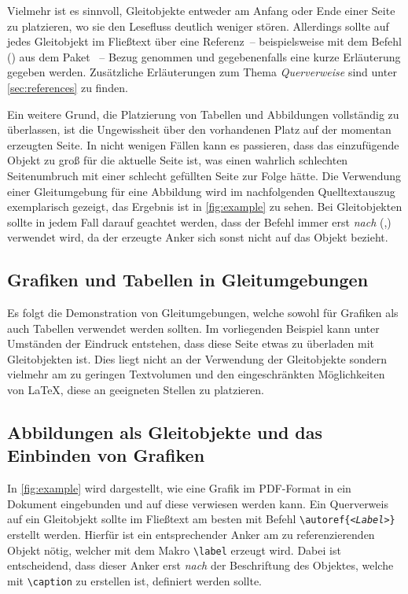 \documentclass[%
  english,ngerman,%
  cdgeometry=no,DIV=12,automark,%
]{tudscrartcl}
\begin{document}
Vielmehr ist es sinnvoll, Gleitobjekte entweder am Anfang oder Ende einer Seite 
zu platzieren, wo sie den Lesefluss deutlich weniger stören. Allerdings sollte 
auf jedes Gleitobjekt im Fließtext über eine Referenz~-- beispielsweise mit dem 
Befehl () aus dem Paket ~-- 
Bezug genommen und gegebenenfalls eine kurze Erläuterung gegeben werden. 
Zusätzliche Erläuterungen zum Thema \emph{Querverweise} sind unter 
\autoref{sec:references} zu finden.

Ein weitere Grund,  die Platzierung von Tabellen und Abbildungen 
vollständig zu überlassen, ist die Ungewissheit über den vorhandenen Platz auf 
der momentan erzeugten Seite. In nicht wenigen Fällen kann es passieren, dass 
das einzufügende Objekt zu groß für die aktuelle Seite ist, was einen wahrlich 
schlechten Seitenumbruch mit einer schlecht gefüllten Seite zur Folge hätte.
Die Verwendung einer Gleitumgebung für eine Abbildung wird im nachfolgenden 
Quelltextauszug exemplarisch gezeigt, das Ergebnis ist in \autoref{fig:example} 
zu sehen. Bei Gleitobjekten sollte in jedem Fall darauf geachtet werden, dass 
der Befehl  immer erst \emph{nach} 
(,) verwendet wird, da 
der erzeugte Anker sich sonst nicht auf das Objekt bezieht.
%
\begin{Trunk+}
\section{Grafiken und Tabellen in Gleitumgebungen}
Es folgt die Demonstration von Gleitumgebungen, welche sowohl für 
Grafiken als auch Tabellen verwendet werden sollten. Im vorliegenden 
Beispiel kann unter Umständen der Eindruck entstehen, dass diese Seite 
etwas zu überladen mit Gleitobjekten ist. Dies liegt nicht an der 
Verwendung der Gleitobjekte sondern vielmehr am zu geringen Textvolumen 
und den eingeschränkten Möglichkeiten von \LaTeX{}, diese an geeigneten 
Stellen zu platzieren. 

\subsection{Abbildungen als Gleitobjekte und das Einbinden von Grafiken}
In \autoref{fig:example} wird dargestellt, wie eine Grafik im PDF-Format 
in ein Dokument eingebunden und auf diese verwiesen werden kann. Ein 
Querverweis auf ein Gleitobjekt sollte im Fließtext am besten mit Befehl 
\texttt{\textbackslash autoref\{\emph{<Label>}\}} erstellt werden. 
Hierfür ist ein entsprechender Anker am zu referenzierenden Objekt nötig, 
welcher mit dem Makro \texttt{\textbackslash label} erzeugt wird. Dabei 
ist entscheidend, dass dieser Anker erst \emph{nach} der Beschriftung des 
Objektes, welche mit \texttt{\textbackslash caption} zu erstellen ist, 
definiert werden sollte.

\end{Trunk+}
\end{document}
